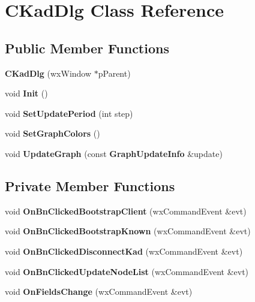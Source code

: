 \section{CKadDlg Class Reference}
\label{classCKadDlg}
\subsection*{Public Member Functions}
\begin{DoxyCompactItemize}
\item 
{\bfseries CKadDlg} (wxWindow $\ast$pParent)\label{classCKadDlg_a2d04df7c01f7b1815286bfc34ee26dd9}

\item 
void {\bfseries Init} ()\label{classCKadDlg_a9dbdc858f082f95c851284a9f0d31d36}

\item 
void {\bfseries SetUpdatePeriod} (int step)\label{classCKadDlg_a3575f594109beeeac729bea317e47736}

\item 
void {\bfseries SetGraphColors} ()\label{classCKadDlg_a9b977e307d69fd8d438a57095176fdcc}

\item 
void {\bfseries UpdateGraph} (const {\bf GraphUpdateInfo} \&update)\label{classCKadDlg_a18c518b30301ed08b8f56626a8b59e25}

\end{DoxyCompactItemize}
\subsection*{Private Member Functions}
\begin{DoxyCompactItemize}
\item 
void {\bfseries OnBnClickedBootstrapClient} (wxCommandEvent \&evt)\label{classCKadDlg_a747b137339d13cf2885e972d3b134aaf}

\item 
void {\bfseries OnBnClickedBootstrapKnown} (wxCommandEvent \&evt)\label{classCKadDlg_a8140ebfadf9b094eba18f239d0777903}

\item 
void {\bfseries OnBnClickedDisconnectKad} (wxCommandEvent \&evt)\label{classCKadDlg_a180435a6af66f30fe62591934c39a3d9}

\item 
void {\bfseries OnBnClickedUpdateNodeList} (wxCommandEvent \&evt)\label{classCKadDlg_a125b6aeea9dae1fe00de93e62660a202}

\item 
void {\bfseries OnFieldsChange} (wxCommandEvent \&evt)\label{classCKadDlg_a9c7292ef3589a21e99a46acd76434248}

\end{DoxyCompactItemize}
